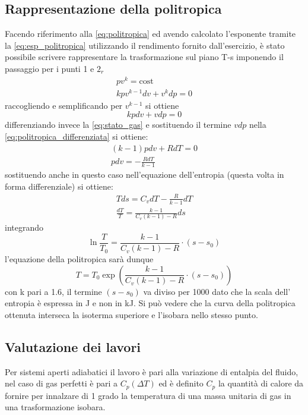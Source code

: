 \documentclass[a4paper,12pt]{article}
\begin{document}
\subsection{Rappresentazione della politropica}
Facendo riferimento alla \eqref{eq:politropica} ed avendo calcolato l'esponente tramite la \eqref{eq:esp_politropica}
utilizzando il rendimento fornito dall'esercizio, è stato possibile scrivere rappresentare la trasformazione sul piano T-s
imponendo il passaggio per i punti 1 e $2_r$
\begin{gather*}
    pv^k = \text{cost} \\
    kpv^{k-1}dv + v^kdp = 0
\end{gather*}
raccogliendo e semplificando per $v^{k-1}$ si ottiene
\begin{equation}
    \label{eq:politropica_differenziata}
    kpdv + vdp = 0
\end{equation}   
differenziando invece la \eqref{eq:stato_gas} e sostituendo il termine $vdp$ nella \eqref{eq:politropica_differenziata}
si ottiene:
\begin{gather*}
    (k-1)pdv + RdT = 0 \\
    pdv = -\frac{RdT}{k-1}
\end{gather*}
sostituendo anche in questo caso nell'equazione dell'entropia (questa volta in forma differenziale)
si ottiene:
\begin{gather*}
    Tds = C_vdT -\frac{R}{k-1}dT \\
    \frac{dT}{T} = \frac{k-1}{C_v(k-1)-R} ds
\end{gather*}
integrando
\begin{equation*}
    \ln\frac{T}{T_0} = \frac{k-1}{C_v(k-1)-R}\cdot(s-s_0)
\end{equation*}
l'equazione della politropica sarà dunque
\begin{equation}
    T = T_0 \exp\left(\frac{k-1}{C_v(k-1)-R}\cdot(s-s_0)\right)
\end{equation}
con k pari a 1.6, il termine $(s-s_0)$ va diviso per 1000 dato che la scala dell' entropia è espressa in J
e non in kJ.
Si può vedere che la curva della politropica ottenuta interseca la isoterma superiore e
l'isobara nello stesso punto.

\subsection{Valutazione dei lavori}
Per sistemi aperti adiabatici il lavoro è pari alla variazione di entalpia del fluido, nel caso
di gas perfetti è pari a $C_p(\Delta T)$ ed è definito $C_p$ la quantità di calore da fornire
per innalzare di 1 grado la temperatura di una massa unitaria di gas in una trasformazione isobara.
\end{document}
